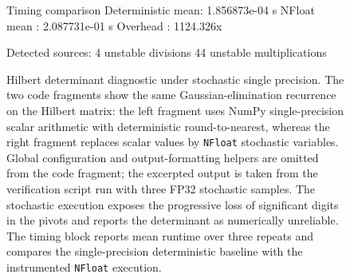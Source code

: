 \documentclass[manuscript, screen]{acmart}
\begin{document}
\begin{figure}[htp]
\begin{minipage}[t]{0.36\linewidth}
\begin{codeoutput}{Timing comparison}
Deterministic mean: 1.856873e-04 s
NFloat mean : 2.087731e-01 s
Overhead : 1124.326x

Detected sources:
4 unstable divisions
44 unstable multiplications
\end{codeoutput}
\end{minipage}
\caption{Hilbert determinant diagnostic under stochastic single precision. The two code fragments show the same Gaussian-elimination recurrence on the Hilbert matrix: the left fragment uses NumPy single-precision scalar arithmetic with deterministic round-to-nearest, whereas the right fragment replaces scalar values by \texttt{NFloat} stochastic variables. Global configuration and output-formatting helpers are omitted from the code fragment; the excerpted output is taken from the verification script run with three FP32 stochastic samples. The stochastic execution exposes the progressive loss of significant digits in the pivots and reports the determinant as numerically unreliable. The timing block reports mean runtime over three repeats and compares the single-precision deterministic baseline with the instrumented \texttt{NFloat} execution.}
\label{fig:hilbert-determinant-demo-np}
\end{figure}
\end{document}
